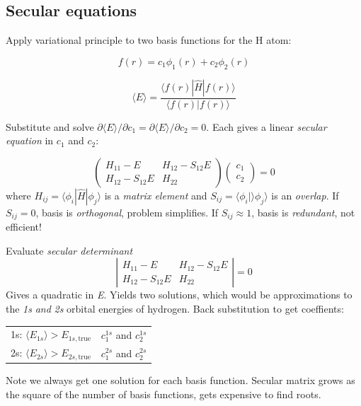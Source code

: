 \documentclass[11pt]{article}
\begin{document}
\subsection{Secular equations}
\label{sec:orgb085c89}
Apply variational principle to two basis functions for the H atom:

\[f(r) =c_1 \phi_1(r) + c_2\phi_2(r) \]

\[\langle E \rangle = \frac{\langle f(r)|\hat{H}|f(r)\rangle}{\langle f(r)|f(r)\rangle} \]

Substitute and solve \(\partial \langle E \rangle/\partial c_1 = \partial \langle E \rangle/\partial c_2 = 0\).  Each gives a linear \emph{secular equation} in \(c_1\) and \(c_2\):

\[
\left(\begin{array}{cc}
H_{11} - E & H_{12}-S_{12}E \\
H_{12}-S_{12}E & H_{22} 
\end{array}\right)\left(
\begin{array}{c} c_1 \\c_2\end{array}\right) =0
\]
where \(H_{ij} = \langle\phi_i|\hat{H}|\phi_j\rangle\) is a \emph{matrix element} and \(S_{ij}=\langle \phi_i | \rangle \phi_j \rangle\) is an \emph{overlap}.  If \(S_{ij} = 0\), basis is \emph{orthogonal}, problem simplifies.  If \(S_{ij}\approx 1\), basis is \emph{redundant}, not efficient!

Evaluate \emph{secular determinant} 
\[ \left| \begin{array}{cc} H_{11} - E & H_{12}-S_{12}E
\\ H_{12}-S_{12}E & H_{22} \end{array}\right| =0 \]
Gives a quadratic in \emph{E}.  Yields two solutions, which would be approximations to the \emph{1s} \emph{and} \emph{2s} orbital energies of hydrogen. Back substitution to get coeffients:

\begin{center}
\begin{tabular}{ll}
1s: \(\langle E_{1s}\rangle > E_{1s,\mathrm{true}}\) & \(c^{1s}_1\) and \(c^{1s}_2\)\\
2s: \(\langle E_{2s}\rangle > E_{2s,\mathrm{true}}\) & \(c^{2s}_1\) and \(c^{2s}_2\)\\
\end{tabular}
\end{center}

Note we always get one solution for each basis function.  Secular
matrix grows as the square of the number of basis functions, gets
expensive to find roots. 
\end{document}
